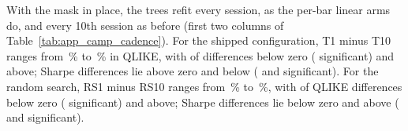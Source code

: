 With the mask in place, the trees refit every session, as the per-bar linear arms do, and
every 10th session as before (first two columns of Table~\ref{tab:app_camp_cadence}). For
the shipped configuration, T1 minus T10 ranges from \campTOneTenQLo\,\% to
\campTOneTenQHi\,\% in QLIKE, with \campTOneTenQBelow{} of \campTOneTenN{} differences below
zero (\campTOneTenQBelowSig{} significant) and \campTOneTenQAbove{} above;
\campTOneTenSAbove{} Sharpe differences lie above zero and \campTOneTenSBelow{} below
(\campTOneTenSAboveSig{} and \campTOneTenSBelowSig{} significant). For the random search,
RS1 minus RS10 ranges from \campRSOneTenQLo\,\% to \campRSOneTenQHi\,\%, with
\campRSOneTenQBelow{} of \campRSOneTenN{} QLIKE differences below zero
(\campRSOneTenQBelowSig{} significant) and \campRSOneTenQAbove{} above;
\campRSOneTenSBelow{} Sharpe differences lie below zero and \campRSOneTenSAbove{} above
(\campRSOneTenSBelowSig{} and \campRSOneTenSAboveSig{} significant).

